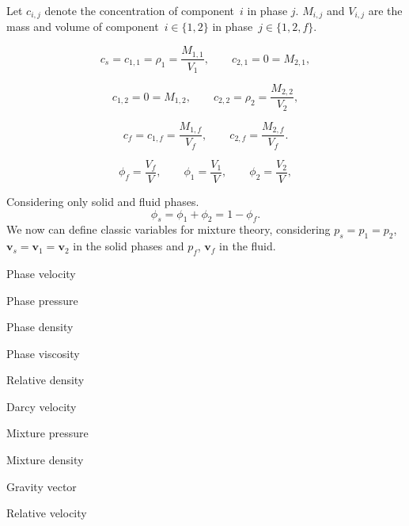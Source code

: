\documentclass[usenames,dvipsnames,letterpaper,landscape,final]{slides}
\def\u{\mathbf{u}}
\def\v{\mathbf{v}}
\begin{document}
\begin{myslideNoFooter}
Let $c_{i,j}$ denote the concentration of component~$i$ in phase $j$. $M_{i,j}$ and $V_{i,j}$ are the mass and volume of component~$i\in\{1,2\}$ in phase~$j\in\{1,2,f\}$.

\begin{equation*}
    c_s = c_{1,1} = \rho_1 = \frac{M_{1,1}}{V_1},\qquad c_{2,1} = 0 = M_{2,1},
\end{equation*}

\begin{equation*}
	c_{1,2} = 0 = M_{1,2},\qquad c_{2,2} = \rho_2 = \frac{M_{2,2}}{V_2},
\end{equation*}

\begin{equation*}
	c_f = c_{1,f} = \frac{M_{1,f}}{V_f},
	\qquad c_{2,f} = \frac{M_{2,f}}{V_f}.
\end{equation*}

\begin{equation*}
	\phi_f = \frac{V_f}{V},\qquad \phi_1 = \frac{V_1}{V},\qquad \phi_2 = \frac{V_2}{V},
\end{equation*}

\end{myslideNoFooter}

\begin{myslideNoFooter}
Considering only solid and fluid phases.
\begin{equation*}
\phi_s = \phi_1 + \phi_2 = 1 - \phi_f.
\end{equation*}
We now can define classic variables for mixture theory, considering $p_s=p_1=p_2$, $\v_s = \v_1 = \v_2$ in the solid phases and $p_f$, $\v_f$ in the fluid.
\bigskip

\parbox{.5\textwidth}{
\begin{dlist}
\item[$\v_f, \v_s$] Phase velocity 
\item[$p_f, p_s$] Phase pressure 
\item[$\rho_f, \rho_s$] Phase density 
\item[$\mu_f, \mu_s$] Phase viscosity 
\item\strut
\item[$\rho_r=\rho_f-\rho_s$\,] Relative density 
\end{dlist}}\parbox{.5\textwidth}{
\begin{dlist}
\item[$\u$] Darcy velocity
\item[$\bar p$] Mixture pressure %
\item[$\bar\rho$] Mixture density
\item[$\mathbf{g}$] Gravity vector 
\item\strut
\item[$\v_r=\v_f-\v_s$] Relative velocity 
\end{dlist}}



\end{myslideNoFooter}
\end{document}

